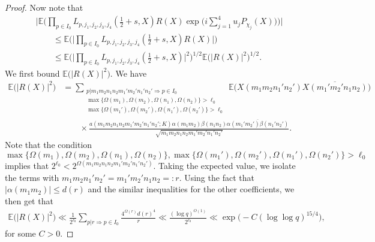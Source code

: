 \documentclass[12pt, reqno]{amsart}
\newcommand{\E}{\mathbb{E}}
\numberwithin{equation}{section}
\numberwithin{theorem}{section}
\numberwithin{equation}{section}
\begin{document}
\begin{proof}
 Now note that
 \begin{align}
    &\Bigg| \E    \Bigg(  \prod_{p \in I_0} L_{p,j_1,j_2,j_3,j_4} ( \tfrac{1}{2}+s,X ) R(X)  \exp\bigg(  i\sum_{j=1}^4 u_jP_{\chi_j}(X)\bigg) \Bigg) \Bigg| \nonumber\\
    &\qquad\leq  \E \Bigg(  \bigg| \prod_{p \in I_0} L_{p,j_1,j_2,j_3,j_4} ( \tfrac{1}{2}+s,X ) R(X)  \bigg| \Bigg) \nonumber \\
    &\qquad \leq \E \Bigg( \bigg| \prod_{p \in I_0} L_{p,j_1,j_2,j_3,j_4} ( \tfrac{1}{2}+s,X )\bigg|^2\Bigg)^{1/2} \E \Big(  | R(X)|^2\Big)^{1/2} .\label{cs}
 \end{align}
 We first bound $\E \big(  | R(X)|^2\big)$. We have 
 \begin{align*}
     \E \Big( | R(X)|^2\Big) &= \sum_{\substack{p|m_1m_2n_1n_2m_1'm_2'n_1'n_2' \Rightarrow p \in I_0 \\ \max\{\Omega(m_1), \Omega(m_2),\Omega(n_1),\Omega(n_2)\}>\ell_0\\\max\{\Omega(m_1'), \Omega(m_2'),\Omega(n_1'),\Omega(n_2')\}>\ell_0}}  \E \Big( X(m_1m_2n_1'n_2') \overline{X(m_1'm_2'n_1n_2) }\Big) \\
     &\qquad \times \frac{a(m_1m_2n_1n_2m_1'm_2'n_1'n_2';K) \alpha(m_1m_2) \beta(n_1n_2) \overline{\alpha(m_1'm_2') \beta(n_1'n_2')}}{\sqrt{m_1m_2n_1n_2m_1'm_2'n_1'n_2'}}.
 \end{align*}
 Note that the condition $$\max\{\Omega(m_1), \Omega(m_2),\Omega(n_1),\Omega(n_2)\},\max\{\Omega(m_1'), \Omega(m_2'),\Omega(n_1'),\Omega(n_2')\}>\ell_0$$ implies that $2^{\ell_0}< 2^{\Omega(m_1m_2n_1n_2m_1'm_2'n_1'n_2')}.$ Taking the expected value, we isolate the terms with $m_1m_2n_1'n_2'=m_1'm_2'n_1n_2=:r$. Using the fact that $|\alpha(m_1m_2)|\leq d(r)$ and the similar inequalities for the other coefficients, we then get that
 \begin{align}
 \label{exp_r}
   \E \Big(  | R(X)|^2\Big) \ll \frac{1}{2^{\ell_0}} \sum_{p |r \Rightarrow p \in I_0} \frac{4^{\Omega(r)} d(r)^4}{r}   \ll \frac{ (\log q)^{O(1)}}{2^{\ell_0}} \ll \exp\big( -C (\log \log q)^{15/4}\big),
 \end{align}
 for some $C>0$.


\end{proof}
\end{document}

